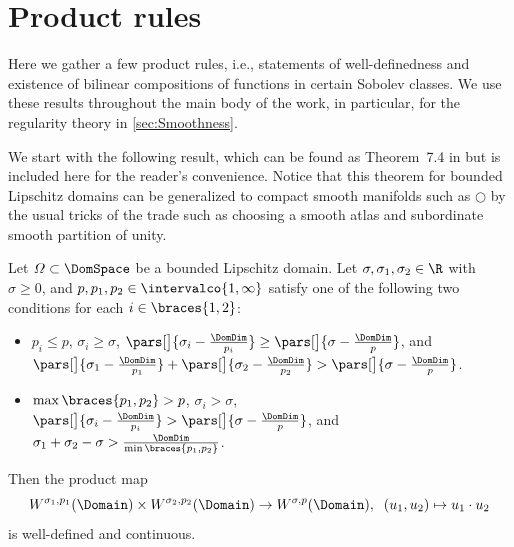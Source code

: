 \section{Product rules}\label{sec:ProductRule}

Here we gather a few product rules, i.e., statements of well-definedness and existence of bilinear compositions of functions in certain Sobolev classes. We use these results throughout the main body of the work, in particular, for the regularity theory in \cref{sec:Smoothness}.

We start with the following result, which can be found as Theorem~7.4 in \cite{zbMATH07447116} but is included here for the reader's convenience.
Notice that this theorem for bounded Lipschitz domains can be generalized to compact smooth manifolds such as $\Circle$ by the usual tricks of the trade such as choosing a smooth atlas and subordinate smooth partition of unity.
\begin{theorem}\label{theo:ProductRuleBehzadanHolst}
    Let $\varOmega \subset \DomSpace$ be a bounded Lipschitz domain.
    Let $ \sigma,\sigma_1,\sigma_2\in\R$ with $ \sigma\ge0 $, and $p,p_1,p_2 \in \intervalco{1,\infty}$ satisfy 
    one of the following two conditions for each $i \in \braces{1,2}$:
    \begin{itemize}
        \item
        $p_i \leq p$,
        $\sigma_i \geq \sigma$,
        $\pars[\big]{\sigma_i - \tfrac{\DomDim}{p_i}} \geq \pars[\big]{ \sigma - \tfrac{\DomDim}{p}}$,
        and
        $\pars[\big]{\sigma_1 - \tfrac{\DomDim}{p_1}} + \pars[\big]{\sigma_2 - \tfrac{\DomDim}{p_2}}
        >
        \pars[\big]{\sigma - \tfrac{\DomDim}{p}}
        $.
        \item          
        $\max \braces{p_1,p_2} > p$,
        $\sigma_i > \sigma$,
        $\pars[\big]{\sigma_i - \tfrac{\DomDim}{p_i}} 
        > 
        \pars[\big]{ \sigma - \tfrac{\DomDim}{p}}$,
        and
        $\sigma_1 + \sigma_2 - \sigma
        >
        \tfrac{\DomDim}{\min \braces{p_1,p_2}}$.
    \end{itemize}
    Then the product map
    \[
        W^{\sigma_1,p_1}(\Domain) \times W^{\sigma_2,p_2}(\Domain)
        \to 
        W^{\sigma,p}(\Domain),
        \;\;
        (u_1,u_2) \mapsto u_1 \cdot u_2
    \]
    is well-defined and continuous.
\end{theorem}


